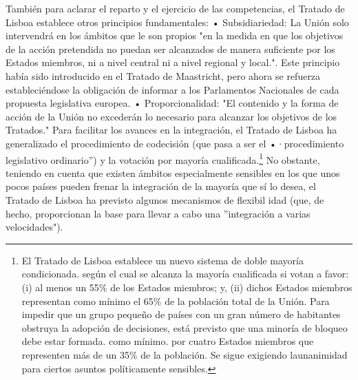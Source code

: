 \documentclass[10pt,a4paper]{article}
\begin{document}
También para aclarar el reparto y el ejercicio de las competencias, el Tratado de Lisboa establece otros principios fundamentales: 
• Subsidiariedad: La Unión solo intervendrá en los ámbitos que le son propios "en la medida en que los objetivos de la acción pretendida no puedan ser alcanzados de manera suficiente por los Estados miembros, ni a nivel central ni a nivel regional y local.". Este principio había sido introducido en el Tratado de Maastricht, pero ahora se refuerza estableciéndose la obligación de informar a los Parlamentos Nacionales de cada propuesta legislativa europea.
• Proporcionalidad: "El contenido y la forma de acción de la Unión no excederán lo necesario para alcanzar los objetivos de los Tratados." Para facilitar los avances en la integración, el Tratado de Lisboa ha generalizado el procedimiento de codecisión (que pasa a ser el •·procedimiento legislativo ordinario'') y la votación por mayoría cualificada.\footnote{%
    El Tratado de Lisboa establece un nuevo sistema de doble mayoría condicionada. según el cual se alcanza la mayoría cualificada si votan a favor: (i) al menos un 55\% de los Estados miembros; y, (ii) dichos Estados miembros representan como mínimo el 65\% de la población total de la Unión. Para impedir que un grupo pequeño de países con un gran número de habitantes obstruya la adopción de decisiones, está previsto que una minoría de bloqueo debe estar formada. como mínimo. por cuatro Estados miembros que representen más de un 35\% de la población. Se sigue exigiendo launanimidad para ciertos asuntos políticamente sensibles.
} No obstante, teniendo en cuenta que existen ámbitos especialmente sensibles en los que unos pocos países pueden frenar la integración de la mayoría que sí lo desea, el Tratado de Lisboa ha previsto algunos mecanismos de flexibil idad (que, de hecho, proporcionan la base para llevar a cabo una ''integración a varias velocidades"). 
\end{document}

